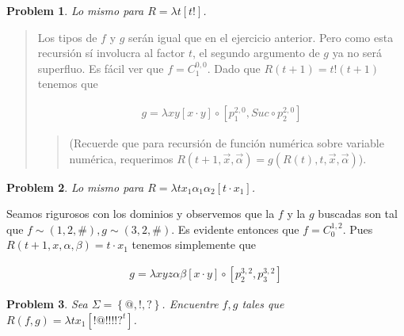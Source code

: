 \documentclass[a4paper, 12pt]{article}
\newtheorem{problem}{Problem}
\newtheorem{problem}{Problem}
\begin{document}
\begin{problem}
    Lo mismo para $R = \lambda t \left[ t!  \right]$.
\end{problem}
   

\small
\begin{quote}

Los tipos de $f$ y $g$ serán igual que en el ejercicio anterior. Pero como esta
recursión sí involucra al factor $t$, el segundo argumento de $g$ ya no será
superfluo. Es fácil ver que $f = C_{1}^{0, 0}$. Dado que $R(t+1) = t!(t+1)$
tenemos que 

\begin{align*}
    g = \lambda xy \left[ x\cdot y  \right] \circ \left[ p_1^{2, 0}, Suc \circ
    p_2^{2, 0} \right] 
\end{align*}

\begin{quote}
    (Recuerde que para recursión de función numérica sobre variable numérica,
    requerimos $R(t+1, \vec{x}, \vec{\alpha}) = g(R(t), t, \vec{x},
    \vec{\alpha})$).
\end{quote}


\end{quote}
\normalsize

\begin{problem}
    Lo mismo para $R = \lambda t x_1 \alpha_1 \alpha_2 \left[ t \cdot x_1  \right]$.
\end{problem}

Seamos rigurosos con los dominios y observemos que la $f$ y la $g$ buscadas son
tal que $f \sim (1, 2, \#), g \sim  (3, 2, \#)$. Es evidente entonces que  $f =
C_0^{1, 2}$. Pues $R(t + 1, x, \alpha, \beta) = t \cdot x_1$ tenemos simplemente
que 

\begin{align*}
    g = \lambda xyz\alpha\beta \left[ x \cdot y  \right] \circ \left[ p_2^{3,
    2}, p_3^{3, 2} \right] 
\end{align*}

\begin{problem}
    Sea $\Sigma = \left\{ @, !, ? \right\} $. Encuentre $f, g$ tales que $R(f,
    g) = \lambda t x_1 \left[ !@!!!!?^t  \right]$.
\end{problem}
\end{document}
